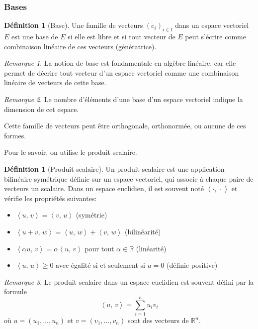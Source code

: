 \documentclass[11pt,a4paper]{article}
\numberwithin{equation}{section}
\theoremstyle{plain}
\theoremstyle{definition}
\newtheorem{definition}[theorem]{Définition}
\theoremstyle{remark}
\newtheorem*{remark}{Remarque}
\newcommand{\R}{\mathbb{R}}
\newcommand{\ip}[2]{\left\langle #1,\, #2\right\rangle}
\begin{document}
\subsubsection{Bases}

\begin{definition}[Base]
Une famille de vecteurs \((e_i)_{i \in I}\) dans un espace vectoriel \(E\) est une base de \(E\) si elle est libre et si tout vecteur de \(E\) peut s'écrire  comme combinaison linéaire de ces vecteurs (génératrice).
\end{definition}

\begin{remark}
    La notion de base est fondamentale en algèbre linéaire, car elle permet de décrire tout vecteur d'un espace vectoriel comme une combinaison linéaire de vecteurs de cette base.
\end{remark}

\begin{remark}
    Le nombre d'éléments d'une base d'un espace vectoriel indique la dimension de cet espace.
\end{remark}

Cette famille de vecteurs peut être orthogonale, orthonormée, ou aucune de ces formes.

Pour le savoir, on utilise le produit scalaire.


\begin{definition}[Produit scalaire] \label{def:ip}
    Un produit scalaire est une application bilinéaire symétrique définie sur un espace vectoriel, qui associe à chaque paire de vecteurs un scalaire. Dans un espace euclidien, il est souvent noté \(\ip{\cdot}{\cdot}\) et vérifie les propriétés suivantes:
    \begin{itemize}
        \item \(\ip{u}{v} = \ip{v}{u}\) (symétrie)
        \item \(\ip{u + v}{w} = \ip{u}{w} + \ip{v}{w}\) (bilinéarité)
        \item \(\ip{\alpha u}{v} = \alpha \ip{u}{v}\) pour tout \(\alpha \in \R\) (linéarité)
        \item \(\ip{u}{u} \geq 0\) avec égalité si et seulement si \(u = 0\) (définie positive)
    \end{itemize}
\end{definition}

\begin{remark} \label{rem:ip}
    Le produit scalaire dans un espace euclidien est souvent défini par la formule
    \[
        \ip{u}{v} = \sum_{i=1}^n u_i v_i
    \]
    où \(u = (u_1, \ldots, u_n)\) et \(v = (v_1, \ldots, v_n)\) sont des vecteurs de \(\R^n\).
\end{remark}
\end{document}
